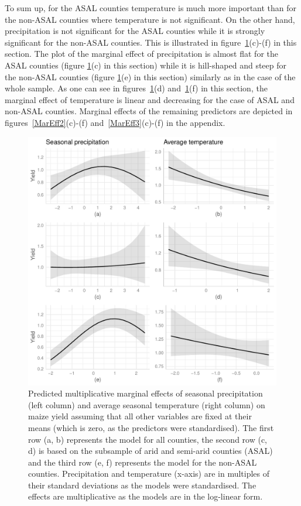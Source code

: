 \documentclass[12pt]{iopart}
\begin{document}
To sum up, for the ASAL counties temperature is much more important than for the non-ASAL counties where temperature is not significant. On the other hand, precipitation is not significant for the ASAL counties while it is strongly significant for the non-ASAL counties. This is illustrated in figure~\ref{MarEff1}(c)-(f) in this section. The plot of the marginal effect of precipitation is almost flat for the ASAL counties (figure \ref{MarEff1}(c) in this section) while it is hill-shaped and steep for the non-ASAL counties (figure \ref{MarEff1}(e) in this section) similarly as in the case of the whole sample. As one can see in figures~\ref{MarEff1}(d) and~\ref{MarEff1}(f) in this section, the marginal effect of temperature is linear and decreasing for the case of ASAL and non-ASAL counties. Marginal effects of the remaining predictors are depicted in figures~\ref{MarEff2}(c)-(f) and~\ref{MarEff3}(c)-(f) in the appendix.


  \begin{figure}%
    \includegraphics{Figure1a_1f.pdf}
\caption{Predicted multiplicative marginal effects of seasonal precipitation (left column) and average seasonal temperature (right column) on maize yield assuming that all other variables are fixed at their means (which is zero, as the predictors were standardised). The first row (a, b) represents the model for all counties, the second row (c, d) is based on the subsample of arid and semi-arid counties (ASAL) and the third row (e, f) represents the model for the non-ASAL counties. Precipitation and temperature (x-axis) are in multiples of their standard deviations as the models were standardised. The effects are multiplicative as the models are in the log-linear form.}\label{MarEff1}
\end{figure}
\end{document}

